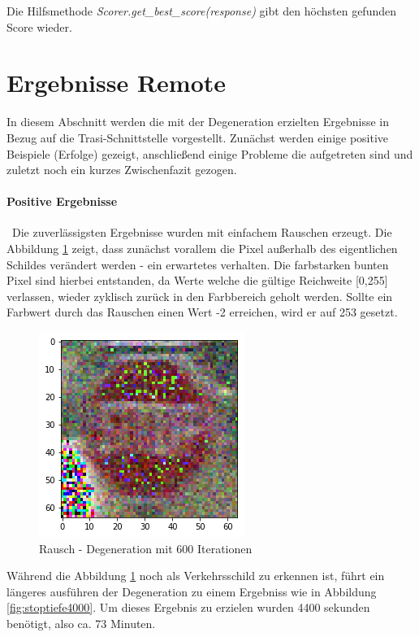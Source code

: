 Die Hilfsmethode \textit{Scorer.get\_best\_score(response)} gibt den höchsten gefunden Score wieder.
\newpage
\begin{small}
\end{small}
\section{Ergebnisse Remote}
\label{sec:DegenerationErgebnisse}
In diesem Abschnitt werden die mit der Degeneration erzielten Ergebnisse in Bezug auf die Trasi-Schnittstelle vorgestellt. Zunächst werden einige positive Beispiele (Erfolge) gezeigt, anschließend einige Probleme die aufgetreten sind und zuletzt noch ein kurzes Zwischenfazit gezogen. 
\paragraph{Positive Ergebnisse} ~\newline Die zuverlässigsten Ergebnisse wurden mit einfachem Rauschen erzeugt. Die Abbildung \ref{fig:stoptiefe600} zeigt, dass zunächst vorallem die Pixel außerhalb des eigentlichen Schildes verändert werden - ein erwartetes verhalten. Die farbstarken bunten Pixel sind hierbei entstanden, da Werte welche die gültige Reichweite [0,255] verlassen, wieder zyklisch zurück in den Farbbereich geholt werden. Sollte ein Farbwert durch das Rauschen einen Wert -2 erreichen, wird er auf 253 gesetzt.  

\begin{figure}[h]
	\centering
	\includegraphics[width=0.4\linewidth]{Images/DegenSamples/StopTiefe600}
	\caption[Degeneration Tiefe 600]{Rausch - Degeneration mit 600 Iterationen}
	\label{fig:stoptiefe600}
\end{figure}

Während die Abbildung \ref{fig:stoptiefe600} noch als Verkehrsschild zu erkennen ist, führt ein längeres ausführen der Degeneration zu einem Ergebniss wie in Abbildung \ref{fig:stoptiefe4000}. Um dieses Ergebnis zu erzielen wurden 4400 sekunden benötigt, also ca. 73 Minuten.

